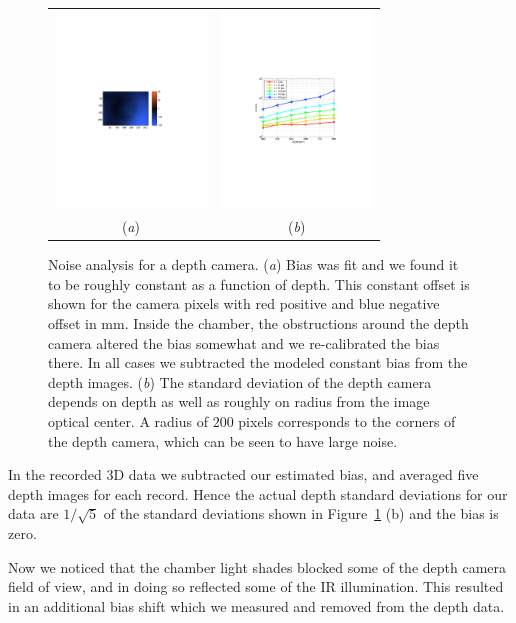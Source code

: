\begin{figure}
\centering
\begin{tabular}{ c c }
  \includegraphics[height=5.2cm,trim=160 300 170 310,clip]{Figures/BiasError} &
  \includegraphics[height=5.2cm,trim=110 240 50 260,clip]{Figures/SigmaRadius} \\
  (\emph{a}) & (\emph{b}) \\
\end{tabular}
\caption{Noise analysis for a depth camera.  (\emph{a}) Bias was fit and we found it to be roughly constant as a function of depth.  This constant offset is shown for the camera pixels with red positive and blue negative offset in mm.  Inside the chamber, the obstructions around the depth camera altered the bias somewhat and we re-calibrated the bias there.  In all cases we subtracted the modeled constant bias from the depth images.  (\emph{b}) The standard deviation of the depth camera depends on depth as well as roughly on radius from the image optical center.  A radius of $200$ pixels corresponds to the corners of the depth camera, which can be seen to have large noise. }
\label{fig:Bias}
\end{figure}


In the recorded $3$D data we subtracted our estimated bias, and averaged five depth images for each record.  Hence the actual depth standard deviations for our data are $1/\sqrt{5}$ of the standard deviations shown in Figure~\ref{fig:Bias} (b) and the bias is zero.

Now we noticed that the chamber light shades blocked some of the depth camera field of view, and in doing so reflected some of the IR illumination.  This resulted in an additional bias shift which we measured and removed from the depth data. %
